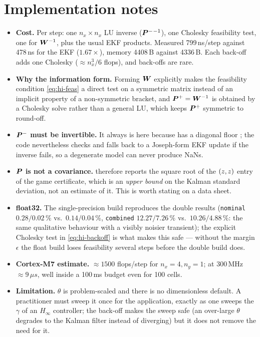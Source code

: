 \section{Implementation notes}
\begin{itemize}[nosep]
\item \textbf{Cost.}  Per step: one $n_x\times n_x$ LU inverse ($\bm{P}^{-}{}^{-1}$), one Cholesky
feasibility test, one  for $\bm{W}^{-1}$, plus the usual EKF products.  Measured
799\,ns/step against 478\,ns for the EKF ($1.67\times$), memory
4408\,B against 4336\,B.  Each back-off adds one Cholesky
($\approx n_x^3/6$ flops), and back-offs are rare.
\item \textbf{Why the information form.}  Forming $\bm{W}$ explicitly makes the feasibility condition
\eqref{eq:hi-feas} a direct test on a symmetric matrix instead of an implicit property of a
non-symmetric bracket, and $\bm{P}^{+}=\bm{W}^{-1}$ is obtained by a Cholesky solve rather than a general
LU, which keeps $\bm{P}^{+}$ symmetric to round-off.
\item \textbf{$\bm{P}^{-}$ must be invertible.}  It always is here because  has a
diagonal floor ; the code nevertheless checks  and falls back to
a Joseph-form EKF update if the inverse fails, so a degenerate model can never produce NaNs.
\item \textbf{$\bm{P}$ is not a covariance.}   therefore reports the square root of
the $(z,z)$ entry of the game certificate, which is an \emph{upper bound} on the Kalman
standard deviation, not an estimate of it.  This is worth stating on a data sheet.
\item \textbf{float32.}  The single-precision build reproduces the double results
(\texttt{nominal} $0.28/0.02\,\%$ vs.\ $0.14/0.04\,\%$, \texttt{combined} $12.27/7.26\,\%$ vs.\
$10.26/4.88\,\%$: the same qualitative behaviour with a visibly noisier transient); the explicit Cholesky test in
\eqref{eq:hi-backoff} is what makes this safe --- without the margin $\epsilon$ the float build
loses feasibility several steps before the double build does.
\item \textbf{Cortex-M7 estimate.}  $\approx1500$ flops/step for $n_x=4,n_y=1$; at
300\,MHz $\approx9\,\ensuremath{\mu}s$, well inside a 100\,ms
budget even for 100 cells.
\item \textbf{Limitation.}  $\theta$ is problem-scaled and there is no dimensionless default.  A
practitioner must sweep it once for the application, exactly as one sweeps the $\gamma$ of an
$H_\infty$ controller; the back-off makes the sweep safe (an over-large $\theta$ degrades to the
Kalman filter instead of diverging) but it does not remove the need for it.
\end{itemize}

